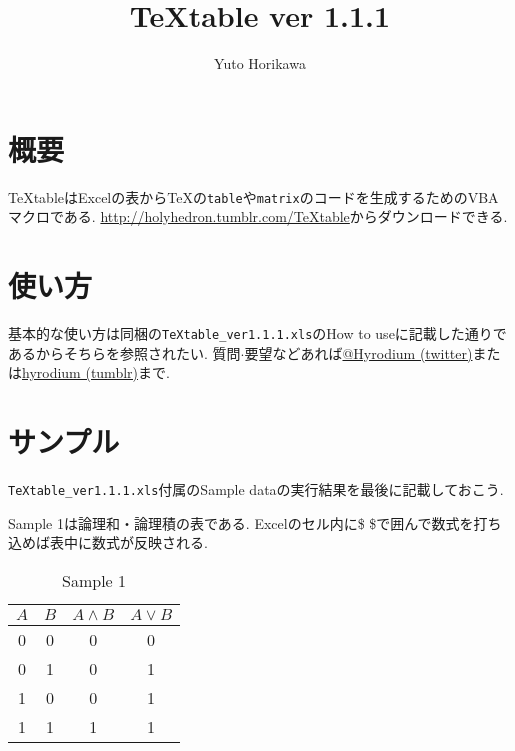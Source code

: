 \documentclass{jsarticle}
\title{TeXtable ver 1.1.1}
\author{Yuto Horikawa}
\begin{document}
\maketitle
\vspace{-3zw}
\section{概要}
TeXtableはExcelの表から\TeX の\verb|table|や\verb|matrix|のコードを生成するためのVBAマクロである.
\url{http://holyhedron.tumblr.com/TeXtable}からダウンロードできる.
\section{使い方}
基本的な使い方は同梱の\verb|TeXtable_ver1.1.1.xls|のHow to useに記載した通りであるからそちらを参照されたい.
質問$\cdot$要望などあれば\href{https://twitter.com/Hyrodium}{@Hyrodium (twitter)}または\href{http://hyrodium.tumblr.com/}{hyrodium (tumblr)}まで.
\section{サンプル}
\verb|TeXtable_ver1.1.1.xls|付属のSample dataの実行結果を最後に記載しておこう.

Sample 1は論理和・論理積の表である.
Excelのセル内に\$ \$で囲んで数式を打ち込めば表中に数式が反映される.
\vspace{-0.5em}
\begin{table}[htb]
	\captionsetup{labelformat=empty,labelsep=none}
	\caption{Sample 1}
	\label{sample1}
	\centering
	\begin{tabular}{|c|c|c|c|}\hline
		$A$	&$B$	&$A\land B$	&$A\lor B$	\\ \hline
		0	&0	&0	&0	\\ \hline
		0	&1	&0	&1	\\ \hline
		1	&0	&0	&1	\\ \hline
		1	&1	&1	&1	\\ \hline
	\end{tabular}
\end{table}
\end{document}
